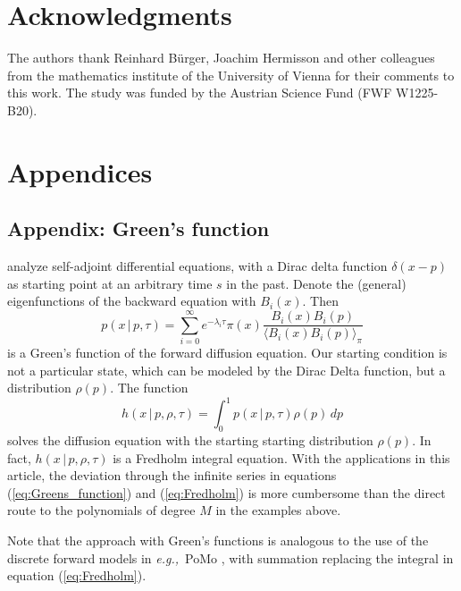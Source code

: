 \documentclass[preprint]{elsarticle}
\newcommand\given{{\,|\,}}
\newcommand\eg{{\it e.g.,}}
\begin{document}
\section*{Acknowledgments}

The authors thank Reinhard B\"urger, Joachim Hermisson and other colleagues from the mathematics institute of the University of Vienna for their comments to this work. The study was funded by the Austrian Science Fund (FWF W1225-B20). %

\section{Appendices}
\subsection{Appendix: Green's function}\label{section:Greens_function}

\citet{Song12} analyze self-adjoint differential equations, with a Dirac delta function $\delta(x-p)$ as starting point at an arbitrary time $s$ in the past. Denote the (general) eigenfunctions of the backward equation with $B_i(x)$. Then 
\begin{equation}\label{eq:Greens_function}
    p(x\given p,\tau)=\sum_{i=0}^\infty e^{-\lambda_i \tau}\pi(x) \frac{B_i(x)B_i(p)}{\langle B_i(x)B_i(p) \rangle_{\pi}}
\end{equation}
is a Green's function of the forward diffusion equation. %
Our starting condition is not a particular state, which can be modeled by the Dirac Delta function, but a distribution $\rho(p)$. The function 
\begin{equation}\label{eq:Fredholm}
    h(x\given p,\rho,\tau)=\int_0^1 p(x\given p,\tau)\rho(p)\,dp
\end{equation}
solves the diffusion equation with the starting starting distribution $\rho(p)$. In fact, $h(x\given p,\rho,\tau)$ is a Fredholm integral equation. %
With the applications in this article, the deviation through the infinite series in equations (\ref{eq:Greens_function}) and (\ref{eq:Fredholm}) is more cumbersome than the direct route to the polynomials of degree $M$ in the examples above. 

Note that the approach with Green's functions is analogous to the use of the discrete forward models in \eg\ PoMo \citep{Schrempf2016}, with summation replacing the integral in equation (\ref{eq:Fredholm}).
\end{document}
